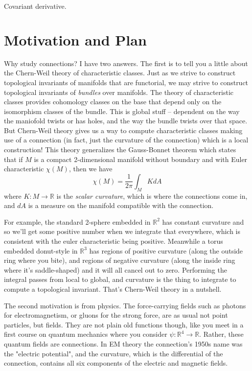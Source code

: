 \documentclass[12pt]{article}
\newcommand{\rr}{\ensuremath{\mathbb{R}}}
\begin{document}
Covariant derivative.

\section{Motivation and Plan}
Why study connections? I have two answers. The first is to tell you a little about the Chern-Weil theory of characteristic classes. Just as we strive to construct topological invariants of manifolds that are functorial, we may strive to construct topological invariants of \emph{bundles} over manifolds. The theory of characteristic classes provides cohomology classes on the base that depend only on the isomorphism classes of the bundle. This is global stuff -- dependent on the way the maniofold twists or has holes, and the way the bundle twists over that space. But Chern-Weil theory gives us a way to compute characteristic classes making use of a connection (in fact, just the curvature of the connection) which is a local construction! This theory generalizes the Gauss-Bonnet theorem which states that if $M$ is a compact 2-dimensional manifold without boundary and with Euler characteristic $\chi(M)$, then we have $$\chi(M) = \frac{1}{2\pi}\int_M K dA$$ where $K:M\to\rr$ is the \emph{scalar curvature}, which is where the connections come in, and $dA$ is a measure on the manifold compatible with the connection.

For example, the standard 2-sphere embedded in $\rr^2$ has constant curvature and so we'll get some positive number when we integrate that everywhere, which is consistent with the euler characteristic being positive. Meanwhile a torus embedded donut-style in $\rr^3$ has regions of positive curvature (along the outside ring where you bite), and regions of negative curvature (along the inside ring where it's saddle-shaped) and it will all cancel out to zero. Performing the integral passes from local to global, and curvature is the thing to integrate to compute a topological invariant. That's Chern-Weil theory in a nutshell.

The second motivation is from physics. The force-carrying fields such as photons for electromagnetism, or gluons for the strong force, are as usual not point particles, but fields. They are not plain old functions though, like you meet in a first course on quantum mechanics where you consider $\psi:\rr^4\to \rr$. Rather, these quantum fields are connections. In EM theory the connection's 1950s name was the "electric potential", and the curvature, which is the differential of the connection, contains all six components of the electric and magnetic fields.
\end{document}
